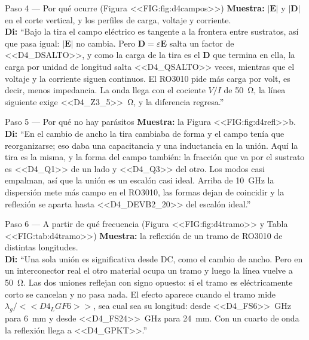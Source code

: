 \documentclass[11pt,letterpaper]{article}
\begin{document}
\begin{paso}{Paso 4 --- Por qué ocurre (Figura <<FIG:fig:d4campos>>)}
\textbf{Muestra:} $|\mathbf{E}|$ y $|\mathbf{D}|$ en el corte vertical, y los perfiles de carga, voltaje y corriente.\\
\textbf{Di:} ``Bajo la tira el campo eléctrico es tangente a la frontera entre sustratos, así que pasa igual: $|\mathbf{E}|$ no cambia. Pero $\mathbf{D}=\varepsilon\mathbf{E}$ salta un factor de <<D4_DSALTO>>, y como la carga de la tira es el $\mathbf{D}$ que termina en ella, la carga por unidad de longitud salta <<D4_QSALTO>> veces, mientras que el voltaje y la corriente siguen continuos. El RO3010 pide más carga por volt, es decir, menos impedancia. La onda llega con el cociente $V/I$ de \SI{50}{\ohm}, la línea siguiente exige \SI{<<D4_Z3_5>>}{\ohm}, y la diferencia regresa.''
\end{paso}

\begin{paso}{Paso 5 --- Por qué no hay parásitos}
\textbf{Muestra:} la Figura <<FIG:fig:d4refl>>b.\\
\textbf{Di:} ``En el cambio de ancho la tira cambiaba de forma y el campo tenía que reorganizarse; eso daba una capacitancia y una inductancia en la unión. Aquí la tira es la misma, y la forma del campo también: la fracción que va por el sustrato es <<D4_Q1>> de un lado y <<D4_Q3>> del otro. Los modos casi empalman, así que la unión es un escalón casi ideal. Arriba de \SI{10}{GHz} la dispersión mete más campo en el RO3010, las formas dejan de coincidir y la reflexión se aparta hasta <<D4_DEVB2_20>> del escalón ideal.''
\end{paso}

\begin{paso}{Paso 6 --- A partir de qué frecuencia (Figura <<FIG:fig:d4tramo>> y Tabla <<FIG:tab:d4tramo>>)}
\textbf{Muestra:} la reflexión de un tramo de RO3010 de distintas longitudes.\\
\textbf{Di:} ``Una sola unión es significativa desde DC, como el cambio de ancho. Pero en un interconector real el otro material ocupa un tramo y luego la línea vuelve a \SI{50}{\ohm}. Las dos uniones reflejan con signo opuesto: si el tramo es eléctricamente corto se cancelan y no pasa nada. El efecto aparece cuando el tramo mide $\lambda_g/<<D4_LGF6>>$, sea cual sea su longitud: desde \SI{<<D4_FS6>>}{GHz} para \SI{6}{mm} y desde \SI{<<D4_FS24>>}{GHz} para \SI{24}{mm}. Con un cuarto de onda la reflexión llega a <<D4_GPKT>>.''
\end{paso}
\end{document}
